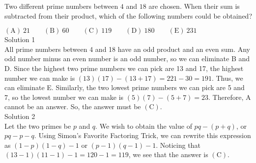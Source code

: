 
Two different prime numbers between $4$ and $18$ are chosen. When their sum is subtracted from their product, which of the following numbers could be obtained?

$\mathrm{(A) \ 21 } \qquad \mathrm{(B) \ 60 } \qquad \mathrm{(C) \ 119 } \qquad \mathrm{(D) \ 180 } \qquad \mathrm{(E) \ 231 }$
\\
Solution 1
\\
All prime numbers between 4 and 18 have an odd product and an even sum. Any odd number minus an even number is an odd number, so we can eliminate B and D. Since the highest two prime numbers we can pick are 13 and 17, the highest number we can make is $(13)(17)-(13+17) = 221 - 30 = 191$. Thus, we can eliminate E. Similarly, the two lowest prime numbers we can pick are 5 and 7, so the lowest number we can make is $(5)(7)-(5+7) = 23$. Therefore, A cannot be an answer. So, the answer must be $\mathrm{(C)}$.
\\
Solution 2
\\
Let the two primes be $p$ and $q$. We wish to obtain the value of $pq-(p+q)$, or $pq-p-q$. Using Simon's Favorite Factoring Trick, we can rewrite this expression as $(1-p)(1-q) -1$ or $(p-1)(q-1) -1$. Noticing that $(13-1)(11-1) - 1 = 120-1 = 119$, we see that the answer is $\mathrm{(C)}$.
